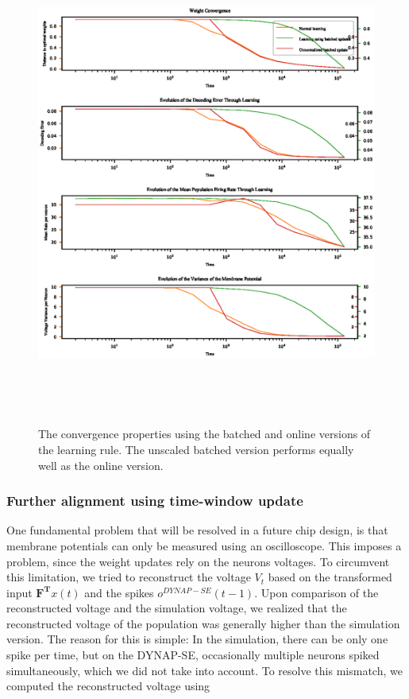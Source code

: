 \documentclass[twoside,11pt]{article}
\begin{document}
\begin{figure}[!htb]
  \centering
  \includegraphics[width = \columnwidth, height=16cm]{figures/convergence_normal_vs_ub_vs_ub_nn.eps}
  \caption{The convergence properties using the batched and online versions of the learning rule. The
  unscaled batched version performs equally well as the online version.}
  \label{fig:batched_update}
\end{figure}

\subsubsection{Further alignment using time-window update}
One fundamental problem that will be resolved in a future chip design, is that
membrane potentials can only be measured using an oscilloscope. This imposes a problem, since
the weight updates rely on the neurons voltages.
To circumvent this limitation, we tried to
reconstruct the voltage $V_{t}$ based on the transformed input $\mathbf{F^T}x(t)$ and the
spikes $o^{DYNAP-SE}(t-1)$. Upon comparison of the reconstructed voltage and the simulation voltage,
we realized that the reconstructed voltage of the population was generally higher than the simulation
version. The reason for this is simple: In the simulation, there can be only one spike per time, but
on the DYNAP-SE, occasionally multiple neurons spiked simultaneously, which we did not take into account.
To resolve this mismatch, we computed the reconstructed voltage using
\end{document}
